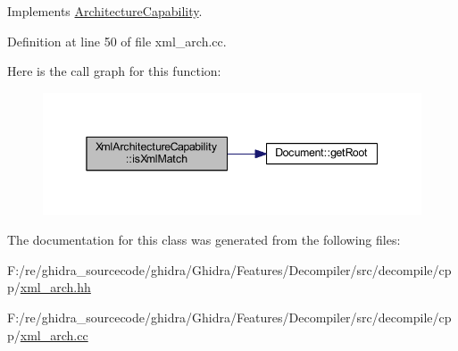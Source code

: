 Implements \mbox{\hyperlink{class_architecture_capability_a653243b342d480273e0f04f7194094b8}{Architecture\+Capability}}.



Definition at line 50 of file xml\+\_\+arch.\+cc.

Here is the call graph for this function\+:
\nopagebreak
\begin{figure}[H]
\begin{center}
\leavevmode
\includegraphics[width=345pt]{class_xml_architecture_capability_ab834c8722ce6813e4b5cf34a207b0f52_cgraph}
\end{center}
\end{figure}


The documentation for this class was generated from the following files\+:\begin{DoxyCompactItemize}
\item 
F\+:/re/ghidra\+\_\+sourcecode/ghidra/\+Ghidra/\+Features/\+Decompiler/src/decompile/cpp/\mbox{\hyperlink{xml__arch_8hh}{xml\+\_\+arch.\+hh}}\item 
F\+:/re/ghidra\+\_\+sourcecode/ghidra/\+Ghidra/\+Features/\+Decompiler/src/decompile/cpp/\mbox{\hyperlink{xml__arch_8cc}{xml\+\_\+arch.\+cc}}\end{DoxyCompactItemize}
